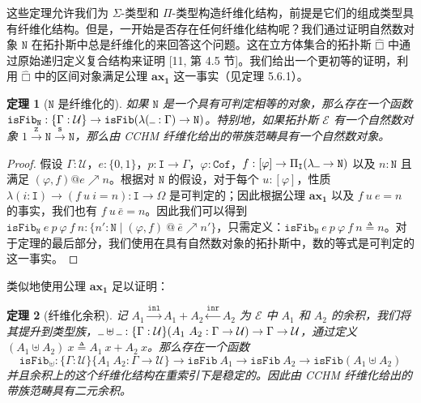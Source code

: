 \documentclass{ctexrep}
\theoremstyle{plain}
\newtheorem{theorem}{定理}[section]
\theoremstyle{definition}
\theoremstyle{remark}
\newcommand\hatcube{\widehat{□}}
\newcommand{\ax}[1]{\mathbf{ax_{#1}}}
\newcommand{\ul}{{\rule[0ex]{0.5em}{0.4pt}}} %
\begin{document}
这些定理允许我们为 $\Sigma$-类型和 $\Pi$-类型构造纤维化结构，前提是它们的组成类型具有纤维化结构。但是，一开始是否存在任何纤维化结构呢？我们通过证明自然数对象 $\mathtt{N}$ 在拓扑斯中总是纤维化的来回答这个问题。这在立方体集合的拓扑斯 $\hatcube$ 中通过原始递归定义复合结构来证明 [11, 第 4.5 节]。我们给出一个更初等的证明，利用 $\hatcube$ 中的区间对象满足公理 $\ax{1}$ 这一事实（见定理 5.6.1）。

\begin{theorem}[$\mathtt{N}$ 是纤维化的]
如果 $\mathtt{N}$ 是一个具有可判定相等的对象，那么存在一个函数 $\mathtt{isFib}_\mathtt{N} : \{\Gamma : \mathcal{U}\} \to \mathtt{isFib}(\lambda(\ul  : \Gamma) \to \mathtt{N})$。特别地，如果拓扑斯 $\mathcal{E}$ 有一个自然数对象 $1 \xrightarrow{\mathtt{z}} \mathtt{N} \xrightarrow{\mathtt{s}} \mathtt{N}$，那么由 CCHM 纤维化给出的带族范畴具有一个自然数对象。
\end{theorem}

\begin{proof}
假设 $\Gamma : \mathcal{U}$，$e : \{0,1\}$，$p : \mathtt{I} \to \Gamma$，$\varphi : \mathtt{Cof}$，$f : [\varphi] \to \Pi_{\mathtt{I}}(\lambda\ul  \to \mathtt{N})$ 以及 $n : \mathtt{N}$ 且满足 $(\varphi, f)@e \nearrow n$。根据对 $\mathtt{N}$ 的假设，对于每个 $u : [\varphi]$，性质 $\lambda(i : \mathtt{I}) \to (f\ u\ i = n) : \mathtt{I} \to \Omega$ 是可判定的；因此根据公理 $\ax{1}$ 以及 $f\ u\ e = n$ 的事实，我们也有 $f\ u\ \bar{e} = n$。因此我们可以得到 $\mathtt{isFib}_\mathtt{N}\ e\ p\ \varphi\ f\ n : \{n' : \mathtt{N} \mid (\varphi, f)\ @\ \bar{e} \nearrow n'\}$，只需定义：$\mathtt{isFib}_\mathtt{N}\ e\ p\ \varphi\ f\ n \triangleq n$。对于定理的最后部分，我们使用在具有自然数对象的拓扑斯中，数的等式是可判定的这一事实。
\end{proof}

类似地使用公理 $\ax{1}$ 足以证明：

\begin{theorem}[纤维化余积]
记 $A_1 \xrightarrow{\mathtt{inl}} A_1 + A_2 \xleftarrow{\mathtt{inr}} A_2$ 为 $\mathcal{E}$ 中 $A_1$ 和 $A_2$ 的余积，我们将其提升到类型族，$\ul  \uplus \ul  : \{\Gamma : \mathcal{U}\}(A_1\ A_2 : \Gamma \to \mathcal{U}) \to \Gamma \to \mathcal{U}$，通过定义 $(A_1 \uplus A_2)\ x \triangleq A_1\ x + A_2\ x$。那么存在一个函数
\begin{equation}
\mathtt{isFib}_\uplus : \{\Gamma : \mathcal{U}\}\{A_1\ A_2 : \Gamma \to \mathcal{U}\} \to \mathtt{isFib}\ A_1 \to \mathtt{isFib}\ A_2 \to \mathtt{isFib}(A_1 \uplus A_2)
\end{equation}
并且余积上的这个纤维化结构在重索引下是稳定的。因此由 CCHM 纤维化给出的带族范畴具有二元余积。
\end{theorem}
\end{document}
